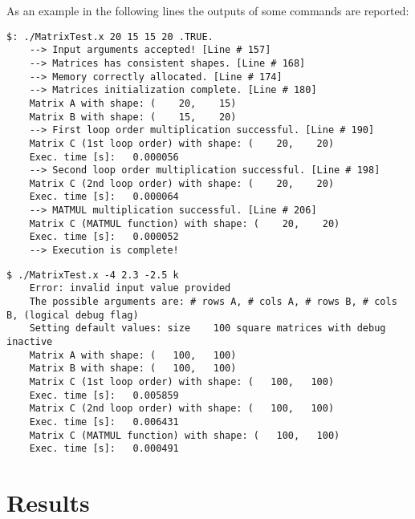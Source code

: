 \documentclass[11pt,a4paper]{article}
\begin{document}
As an example in the following lines the outputs of some commands are reported:
\begin{lstlisting}[caption=Example output with correct arguments. Lines starting with $"-->"$ are produced by the \textit{CheckPoint} subroutine.]
$: ./MatrixTest.x 20 15 15 20 .TRUE.
	--> Input arguments accepted! [Line # 157]
	--> Matrices has consistent shapes. [Line # 168]
	--> Memory correctly allocated. [Line # 174]
	--> Matrices initialization complete. [Line # 180]
	Matrix A with shape: (    20,    15)
	Matrix B with shape: (    15,    20)
	--> First loop order multiplication successful. [Line # 190]
	Matrix C (1st loop order) with shape: (    20,    20)
	Exec. time [s]:   0.000056
	--> Second loop order multiplication successful. [Line # 198]
	Matrix C (2nd loop order) with shape: (    20,    20)
	Exec. time [s]:   0.000064
	--> MATMUL multiplication successful. [Line # 206]
	Matrix C (MATMUL function) with shape: (    20,    20)
	Exec. time [s]:   0.000052
	--> Execution is complete!
\end{lstlisting}

\begin{lstlisting}[caption=Example output with wrong arguments.]
$ ./MatrixTest.x -4 2.3 -2.5 k 
	Error: invalid input value provided
	The possible arguments are: # rows A, # cols A, # rows B, # cols B, (logical debug flag)
	Setting default values: size    100 square matrices with debug inactive
	Matrix A with shape: (   100,   100)
	Matrix B with shape: (   100,   100)
	Matrix C (1st loop order) with shape: (   100,   100)
	Exec. time [s]:   0.005859
	Matrix C (2nd loop order) with shape: (   100,   100)
	Exec. time [s]:   0.006431
	Matrix C (MATMUL function) with shape: (   100,   100)
	Exec. time [s]:   0.000491
\end{lstlisting}

\section{Results} %
\end{document}
